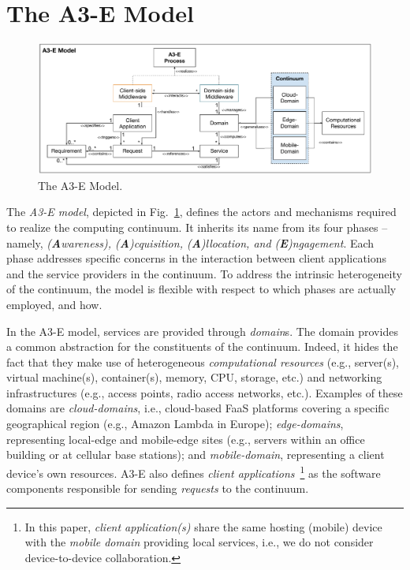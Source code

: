 \section{The A3-E Model}\label{sec:proposal}

\begin{figure}[tbp]
	\includegraphics[width=1\textwidth]{figs/A3-E-model.pdf}
	\caption{The A3-E Model.}
	\label{fig:A3-E-model}
\end{figure}

The \textit{A3-E model}, depicted in Fig.~\ref{fig:A3-E-model}, defines the actors and mechanisms required to realize the computing continuum. It inherits its name from its four phases -- namely, \textit{(\textbf{A}wareness), (\textbf{A})cquisition, (\textbf{A})llocation, and (\textbf{E})ngagement}. Each phase addresses specific concerns in the interaction between client applications and the service providers in the continuum. To address the intrinsic heterogeneity of the continuum, the model is flexible with respect to which phases are actually employed, and how.

In the A3-E model, services are provided through \textit{domain}s. The domain provides a common abstraction for the constituents of the continuum. Indeed, it hides the fact that they make use of heterogeneous \textit{computational resources} (e.g., server(s), virtual machine(s), container(s), memory, CPU, storage, etc.) and networking infrastructures (e.g., access points, radio access networks, etc.). Examples of these domains are \textit{cloud-domains}, i.e., cloud-based FaaS platforms covering a specific geographical region (e.g., Amazon Lambda in Europe); \textit{edge-domains}, representing local-edge and mobile-edge sites (e.g., servers within an office building or at cellular base stations); and \textit{mobile-domain}, representing a client device's own resources. A3-E also defines \textit{client applications}~\footnote{In this paper, \textit{client application(s)} share the same hosting (mobile) device with the \textit{mobile domain} providing local services, i.e., we do not consider device-to-device collaboration.} as the software components responsible for sending \textit{requests} to the continuum.

